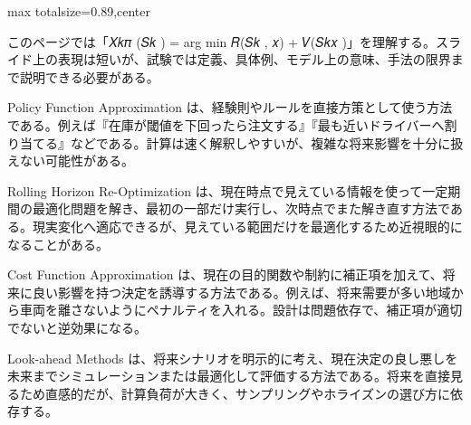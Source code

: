 \begin{minipage}[t]{0.58\textwidth}
\begin{adjustbox}{max totalsize={\textwidth}{0.89\textheight},center}
\begin{minipage}{\textwidth}\scriptsize
{}このページでは「𝑋𝑘𝜋 (𝑆𝑘 ) = arg min 𝑅(𝑆𝑘 , 𝑥) + 𝑉(𝑆𝑘𝑥 )」を理解する。スライド上の表現は短いが、試験では定義、具体例、モデル上の意味、手法の限界まで説明できる必要がある。\par
Policy Function Approximation は、経験則やルールを直接方策として使う方法である。例えば『在庫が閾値を下回ったら注文する』『最も近いドライバーへ割り当てる』などである。計算は速く解釈しやすいが、複雑な将来影響を十分に扱えない可能性がある。\par
Rolling Horizon Re-Optimization は、現在時点で見えている情報を使って一定期間の最適化問題を解き、最初の一部だけ実行し、次時点でまた解き直す方法である。現実変化へ適応できるが、見えている範囲だけを最適化するため近視眼的になることがある。\par
Cost Function Approximation は、現在の目的関数や制約に補正項を加えて、将来に良い影響を持つ決定を誘導する方法である。例えば、将来需要が多い地域から車両を離さないようにペナルティを入れる。設計は問題依存で、補正項が適切でないと逆効果になる。\par
Look-ahead Methods は、将来シナリオを明示的に考え、現在決定の良し悪しを未来までシミュレーションまたは最適化して評価する方法である。将来を直接見るため直感的だが、計算負荷が大きく、サンプリングやホライズンの選び方に依存する。\par

\end{minipage}
\end{adjustbox}
\end{minipage}
